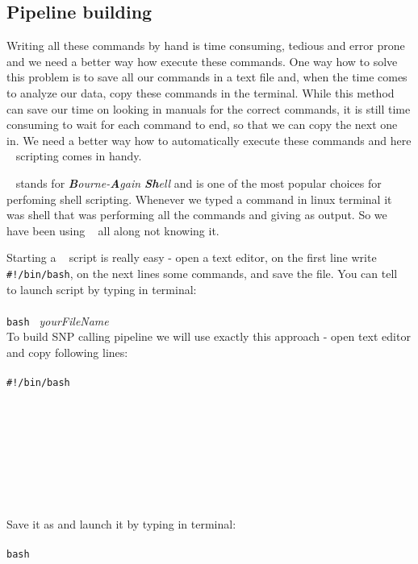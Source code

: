 \subsection{Pipeline building}
Writing all these commands by hand is time consuming, tedious and error prone
and we need a better way how execute these commands.
One way how to solve this problem is to save all our commands
in a text file and, when the time comes to analyze our data, copy these
commands in the terminal. While this method can save our time on looking
in manuals for the correct commands, it is still time consuming to wait
for each command to end, so that we can copy the next one in. 
We need a better way how to automatically execute these commands and
here \bash~ scripting comes in handy.

\bash~ stands for \textit{\textbf{B}ourne-\textbf{A}gain \textbf{Sh}ell}
and is one of the most popular choices for perfoming shell scripting. 
Whenever we typed a command in linux terminal it was shell that was
performing all the commands and giving as output.
So we have been using \bash~ all along not knowing it.

Starting a \bash~ script is really easy - open a text editor, on the
first line write \texttt{\#!/bin/bash}, on the next lines some commands,
and save the file. You can tell \bash~ to launch script by typing in terminal:\\~\\
\texttt{bash }\textit{ yourFileName}\\

To build SNP calling pipeline we will use exactly this approach -
open text editor and copy following lines:\\~\\
\texttt{\#!/bin/bash}\\
\\~\\
\texttt{}\\~\\
\\~\\
\\~\\

Save it as \texttt{\pipename} and launch it by typing in terminal:\\~\\
\texttt{bash \pipename}
